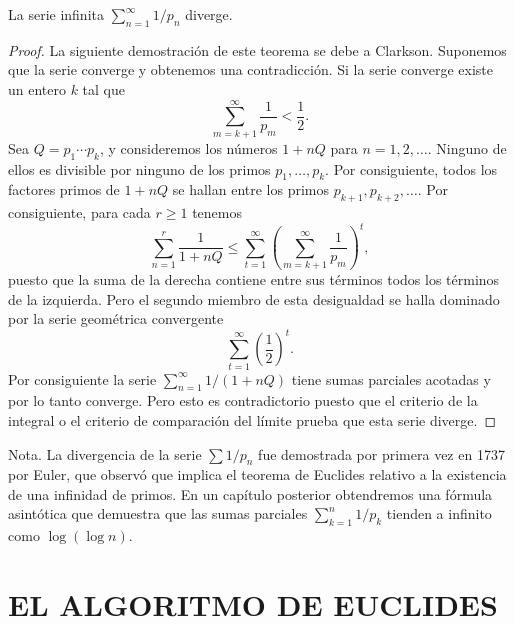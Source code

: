 \documentclass[12pt,a4paper]{book}
\begin{document}
    \begin{teorema}
        La serie infinita $\sum_{n=1}^{\infty}1/p_n$ diverge.
    \end{teorema}

    \begin{proof}
        La siguiente demostración de este teorema se debe a Clarkson. Suponemos que la serie
        converge y obtenemos una contradicción. Si la serie converge existe un entero $k$
        tal que
        \begin{equation*}
            \sum_{m=k+1}^{\infty}\frac{1}{p_m}<\frac{1}{2}.
        \end{equation*}
        Sea $Q=p_1\cdots p_k$, y consideremos los números $1+nQ$ para $n=1,2,\dots$. Ninguno
        de ellos es divisible por ninguno de los primos $p_1,\dots,p_k$. Por consiguiente,
        todos los factores primos de $1+nQ$ se hallan entre los primos $p_{k+1},p_{k+2},\dots$.
        Por consiguiente, para cada $r\geq1$ tenemos
        \begin{equation*}
            \sum_{n=1}^{r}\frac{1}{1+nQ}\leq\sum_{t=1}^{\infty}
            \left(\sum_{m=k+1}^{\infty}\frac{1}{p_m}\right)^{t},
        \end{equation*}
        puesto que la suma de la derecha contiene entre sus términos todos los términos de
        la izquierda. Pero el segundo miembro de esta desigualdad se halla dominado por la
        serie geométrica convergente
        \begin{equation*}
            \sum_{t=1}^{\infty}\left(\frac{1}{2}\right)^{t}.
        \end{equation*}
        Por consiguiente la serie $\sum_{n=1}^{\infty}1/(1+nQ)$ tiene sumas parciales
        acotadas y por lo tanto converge. Pero esto es contradictorio puesto que el criterio
        de la integral o el criterio de comparación del límite prueba que esta serie diverge.
    \end{proof}

    Nota. La divergencia de la serie $\sum1/p_n$ fue demostrada por primera vez en 1737 por
    Euler, que observó que implica el teorema de Euclides relativo a la existencia de una
    infinidad de primos. En un capítulo posterior obtendremos una fórmula asintótica que
    demuestra que las sumas parciales $\sum_{k=1}^{n}1/p_k$ tienden a infinito como
    $\log(\log n)$.

    \section{EL ALGORITMO DE EUCLIDES}
\end{document}
